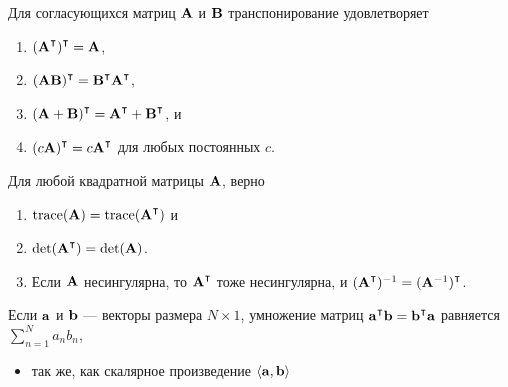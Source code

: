 \begin{frame}
    
    \vspace{2em}
    \Fact{\eqref{ET-fa:owtra}}
    Для согласующихся матриц $\mathbf A$ и $\mathbf B$ транспонирование удовлетворяет
    \begin{enumerate}
        \item $(\boldA^\T)^\T = \boldA$,
        \item $(\boldA \boldB)^\T = \boldB^\T \boldA^\T$,
        \item $(\boldA + \boldB)^\T = \boldA^\T +  \boldB^\T$, и
        \item $(c \boldA)^\T = c \boldA^\T$ для любых постоянных $c$.
    \end{enumerate}

\end{frame}

\begin{frame}

    \vspace{2em}
    \Fact{\eqref{ET-fa:owtra2}}
        Для любой квадратной матрицы $\mathbf A$, верно 
        \begin{enumerate}
            \item $\trace(\boldA) = \trace(\boldA^\T)$ и
            \item $\det(\boldA^\T) = \det(\boldA)$.
            \item Если $\mathbf A$ несингулярна, то $\boldA^\T$ тоже несингулярна, и
                $(\boldA^\T)^{-1}= (\boldA^{-1})^\T$.
        \end{enumerate}
        
    \vspace{.7em}
    Если ${\mathbf a}$ и ${\mathbf b}$ --- векторы размера $N \times 1$, умножение матриц 
    $\bolda^\T \boldb = \boldb^\T \bolda$ равняется $\sum_{n=1}^N a_n b_n$,
    
    \begin{itemize}
        \item так же, как скалярное произведение $\left\langle{ {\mathbf a} ,  {\mathbf b} }\right\rangle$
    \end{itemize}

\end{frame}


